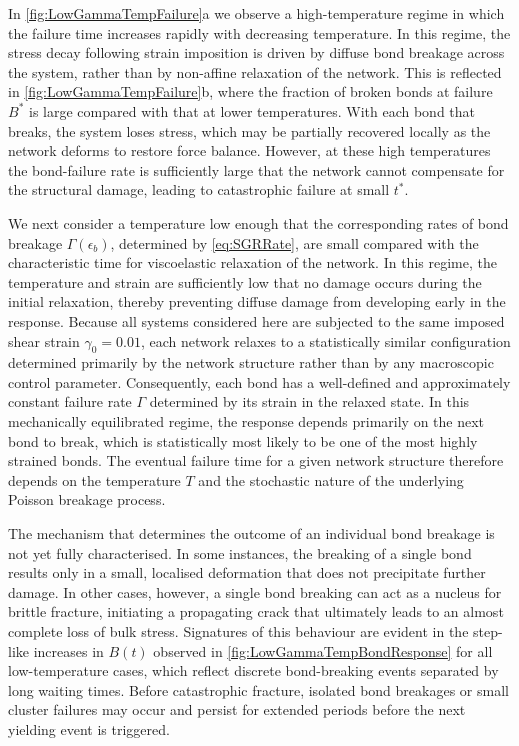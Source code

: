 In \cref{fig:LowGammaTempFailure}a we observe a high-temperature regime in which the failure time increases rapidly with decreasing temperature. In this regime, the stress decay following strain imposition is driven by diffuse bond breakage across the system, rather than by non-affine relaxation of the network. This is reflected in \cref{fig:LowGammaTempFailure}b, where the fraction of broken bonds at failure $B^*$ is large compared with that at lower temperatures. With each bond that breaks, the system loses stress, which may be partially recovered locally as the network deforms to restore force balance. However, at these high temperatures the bond-failure rate is sufficiently large that the network cannot compensate for the structural damage, leading to catastrophic failure at small $t^*$. 

We next consider a temperature low enough that the corresponding rates of bond breakage $\Gamma(\epsilon_b)$, determined by \cref{eq:SGRRate}, are small compared with the characteristic time for viscoelastic relaxation of the network. In this regime, the temperature and strain are sufficiently low that no damage occurs during the initial relaxation, thereby preventing diffuse damage from developing early in the response. Because all systems considered here are subjected to the same imposed shear strain $\gamma_0=0.01$, each network relaxes to a statistically similar configuration determined primarily by the network structure rather than by any macroscopic control parameter. Consequently, each bond has a well-defined and approximately constant failure rate $\Gamma$ determined by its strain in the relaxed state. In this mechanically equilibrated regime, the response depends primarily on the next bond to break, which is statistically most likely to be one of the most highly strained bonds. The eventual failure time for a given network structure therefore depends on the temperature $T$ and the stochastic nature of the underlying Poisson breakage process.

The mechanism that determines the outcome of an individual bond breakage is not yet fully characterised. In some instances, the breaking of a single bond results only in a small, localised deformation that does not precipitate further damage. In other cases, however, a single bond breaking can act as a nucleus for brittle fracture, initiating a propagating crack that ultimately leads to an almost complete loss of bulk stress. Signatures of this behaviour are evident in the step-like increases in $B(t)$ observed in \cref{fig:LowGammaTempBondResponse} for all low-temperature cases, which reflect discrete bond-breaking events separated by long waiting times. Before catastrophic fracture, isolated bond breakages or small cluster failures may occur and persist for extended periods before the next yielding event is triggered.

